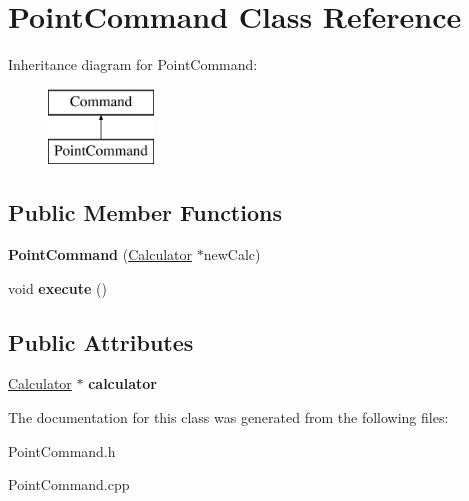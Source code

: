 \hypertarget{class_point_command}{}\section{Point\+Command Class Reference}
\label{class_point_command}
Inheritance diagram for Point\+Command\+:\begin{figure}[H]
\begin{center}
\leavevmode
\includegraphics[height=2.000000cm]{class_point_command}
\end{center}
\end{figure}
\subsection*{Public Member Functions}
\begin{DoxyCompactItemize}
\item 
\hypertarget{class_point_command_acc022d8812e9d289bf723dd900a338bb}{}{\bfseries Point\+Command} (\hyperlink{class_calculator}{Calculator} $\ast$new\+Calc)\label{class_point_command_acc022d8812e9d289bf723dd900a338bb}

\item 
\hypertarget{class_point_command_a681f8465afa18959cd268fab140d9f69}{}void {\bfseries execute} ()\label{class_point_command_a681f8465afa18959cd268fab140d9f69}

\end{DoxyCompactItemize}
\subsection*{Public Attributes}
\begin{DoxyCompactItemize}
\item 
\hypertarget{class_point_command_a63132439ae2e59216eddddd4754f9109}{}\hyperlink{class_calculator}{Calculator} $\ast$ {\bfseries calculator}\label{class_point_command_a63132439ae2e59216eddddd4754f9109}

\end{DoxyCompactItemize}


The documentation for this class was generated from the following files\+:\begin{DoxyCompactItemize}
\item 
Point\+Command.\+h\item 
Point\+Command.\+cpp\end{DoxyCompactItemize}
